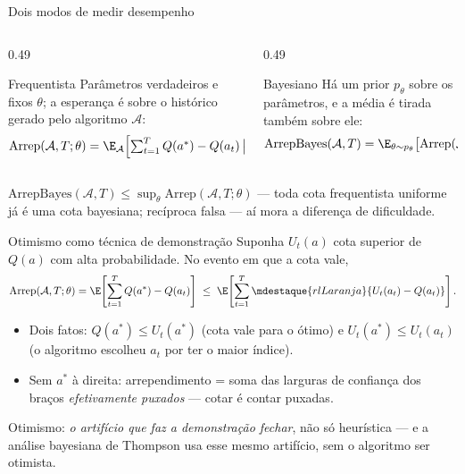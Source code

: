 \documentclass[aspectratio=169, 11pt]{beamer}
\newcommand{\arrep}{\mathrm{Arrep}}
\newcommand{\arrepb}{\mathrm{ArrepBayes}}
\newcommand{\alg}{\mathcal{A}}
\begin{document}
\begin{frame}{Dois modos de medir desempenho}
  \begin{columns}[T]
    \begin{column}{0.49\textwidth}
      \begin{defbox}{Frequentista}
        Parâmetros verdadeiros e fixos $\theta$; a esperança é sobre o
        histórico gerado pelo algoritmo $\alg$:
        {\footnotesize\[
          \arrep(\alg, T; \theta) = \E_{\alg}\!\left[\textstyle\sum_{t=1}^{T}
            Q(a^{*}) - Q(a_t)\,\big|\,\theta\right]
        \]}
        \vspace{-1.3em}
      \end{defbox}
    \end{column}
    \begin{column}{0.49\textwidth}
      \begin{defbox}{Bayesiano}
        Há um prior $p_\theta$ sobre os parâmetros, e a média é tirada
        também sobre ele:
        {\footnotesize\[
          \arrepb(\alg, T) = \E_{\theta \sim p_\theta}\big[
            \arrep(\alg, T; \theta)\big]
        \]}
        \vspace{-1.3em}
      \end{defbox}
    \end{column}
  \end{columns}

  \medskip

  \begin{ideiabox}
    $\arrepb(\alg,T) \le \sup_{\theta} \arrep(\alg, T; \theta)$ —
    \alert{toda cota frequentista uniforme já é uma cota bayesiana};
    recíproca falsa — aí mora a diferença de dificuldade.
  \end{ideiabox}
\end{frame}

\begin{frame}{Otimismo como técnica de demonstração}
  Suponha $U_t(a)$ cota superior de $Q(a)$ com alta probabilidade. No
  evento em que a cota vale,
  \[
    \arrep(\alg, T; \theta)
    = \E\!\left[\sum_{t=1}^{T} Q(a^{*}) - Q(a_t)\right]
    \;\le\;
    \E\!\left[\sum_{t=1}^{T}
      \mdestaque{rlLaranja}{U_t(a_t) - Q(a_t)}\right].
  \]

  \begin{itemize}
    \item Dois fatos: $Q(a^*) \le U_t(a^*)$ (cota vale para o ótimo) e
          $U_t(a^*) \le U_t(a_t)$ (\alert{o algoritmo escolheu $a_t$ por
          ter o maior índice}).
    \item Sem $a^*$ à direita: arrependimento = soma das larguras de
          confiança dos braços \emph{efetivamente puxados} — cotar é
          contar puxadas.
  \end{itemize}

  \begin{ideiabox}
    Otimismo: \emph{o artifício que faz a demonstração fechar}, não só
    heurística — e a análise bayesiana de Thompson usa \alert{esse mesmo
    artifício}, sem o algoritmo ser otimista.
  \end{ideiabox}
\end{frame}
\end{document}
